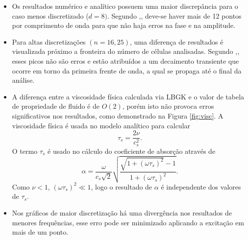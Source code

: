 \begin{itemize}

\item Os resultados numérico e analítico possuem uma maior discrepância para o caso menos discretizado ($d=8)$. Segundo ,\citeyear{Wilde2006}, deve-se haver mais de 12 pontos por comprimento de onda para que não haja erros na fase e na amplitude.

\item Para altas discretizações $(n=16, 25)$, uma diferença de resultados é visualizada próximo a fronteira do número de células analisadas. Segundo ,\citeyear{Viggen2010}, esses picos não são erros e estão atribuídos a um decaimento transiente que ocorre em torno da primeira frente de onda, a qual se propaga até o final da análise.

\item A diferença entre a viscosidade física calculada via LBGK e o valor de tabela de propriedade de fluido é de $O(2)$, porém isto não provoca erros significativos nos resultados, como demonstrado na Figura \ref{fig:visc}. A viscosidade física é usada no modelo analítico para calcular
\begin{equation*}
\tau_s = \frac{2 \nu}{c_s^2}.
\end{equation*}
O termo $\tau_s$ é usado no cálculo do coeficiente de absorção através de
\begin{equation*}
\alpha = \frac{\omega}{c_s \sqrt{2}} \sqrt{\frac{\sqrt{1 + (\omega \tau_s)^2} - 1}{1 + (\omega \tau_s)^2}}.
\end{equation*}
Como $\nu < 1$, $(\omega \tau_s)^2 \ll 1$, logo o resultado de $\alpha$ é independente dos valores de $\tau_s$. 

\item Nos gráficos de maior discretização há uma divergência nos resultados de menores frequências, esse erro pode ser minimizado aplicando a excitação em mais de um ponto.  
\end{itemize}



















